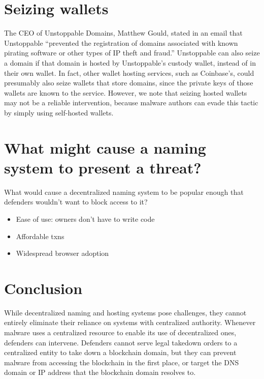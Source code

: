 \documentclass[10pt,sigconf,letterpaper]{acmart}
\begin{document}
\section{Seizing wallets}

The CEO of Unstoppable Domains, Matthew Gould, stated in an email that 
Unstoppable ``prevented the 
registration of domains associated with known pirating software or other types 
of IP theft and 
fraud.'' Unstoppable can also seize a domain if that domain is hosted by 
Unstoppable's custody 
wallet, instead of in their own wallet. In fact, other wallet hosting 
services, such as Coinbase's, 
could presumably also seize wallets that store domains, since the private 
keys of those wallets are 
known to the service. However, we note that seizing hosted wallets may not 
be a reliable 
intervention, because malware authors can evade this tactic by simply using 
self-hosted wallets. 

\section{What might cause a naming system to present a threat?}

What would cause a decentralized naming system to be popular enough that 
defenders wouldn't want to block access to it?
\begin{itemize}
	\item Ease of use: owners don't have to write code
	\item Affordable txns
	\item Widespread browser adoption
\end{itemize}

\section{Conclusion}

While decentralized naming and hosting systems pose challenges, they cannot 
entirely 
eliminate their reliance on systems with centralized authority. Whenever 
malware uses a centralized 
resource to enable its use of decentralized ones, defenders can intervene. 
Defenders cannot serve 
legal takedown orders to a centralized entity to take 
down a blockchain domain, but they can prevent malware from accessing the 
blockchain in the first 
place, or target the DNS domain or IP address that the blockchain domain 
resolves to.
\end{document}
